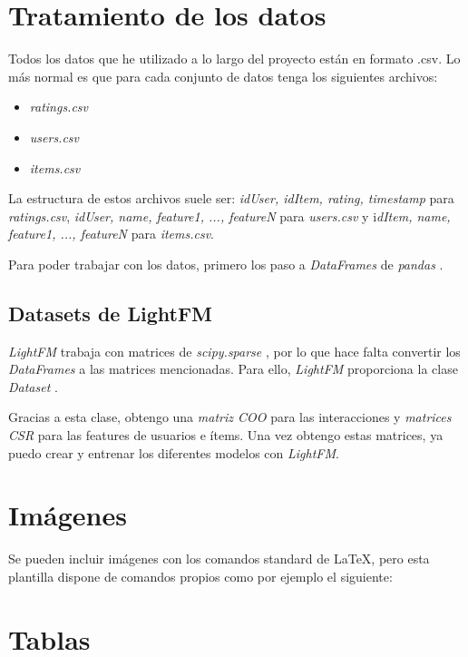 \section{Tratamiento de los datos}\label{tratamiento-datos}
Todos los datos que he utilizado a lo largo del proyecto están en formato .csv. Lo más normal es que para cada conjunto de datos tenga los siguientes archivos:
\begin{itemize}
\tightlist
\item \textit{ratings.csv} 
\item \textit{users.csv}
\item \textit{items.csv}
\end{itemize}
La estructura de estos archivos suele ser: \textit{idUser, idItem, rating, timestamp} para \textit{ratings.csv}, \textit{idUser, name, feature1, ..., featureN} para \textit{users.csv} y i\textit{dItem, name, feature1, ..., featureN} para \textit{items.csv}.

Para poder trabajar con los datos, primero los paso a \textit{DataFrames} de \textit{pandas} \cite{dataframes}.
 
\subsection{Datasets de LightFM}\label{datasets-lightfm}
\textit{LightFM} trabaja con matrices de \textit{scipy.sparse} \cite{scipy-sparse}, por lo que hace falta convertir los \textit{DataFrames} a las matrices mencionadas. 
Para ello, \textit{LightFM} proporciona la clase \textit{Dataset} \cite{dataset-lightfm}.

Gracias a esta clase, obtengo una \textit{matriz COO} \cite{coo-matrix} para las interacciones y \textit{matrices CSR} \cite{csr-matrix} para las features de usuarios e ítems. Una vez obtengo estas matrices, ya puedo crear y entrenar los diferentes modelos con \textit{LightFM}.

\section{Imágenes}

Se pueden incluir imágenes con los comandos standard de \LaTeX, pero esta plantilla dispone de comandos propios como por ejemplo el siguiente:


\section{Tablas}

